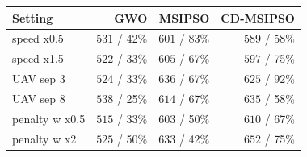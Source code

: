 \begin{tabular}{lrrr}
\hline
Setting & GWO & MSIPSO & CD-MSIPSO \\
\hline
speed x0.5 & $531$ / 42\% & $601$ / 83\% & $589$ / 58\% \\
speed x1.5 & $522$ / 33\% & $605$ / 67\% & $597$ / 75\% \\
UAV sep 3 & $524$ / 33\% & $636$ / 67\% & $625$ / 92\% \\
UAV sep 8 & $538$ / 25\% & $614$ / 67\% & $635$ / 58\% \\
penalty w x0.5 & $515$ / 33\% & $603$ / 50\% & $610$ / 67\% \\
penalty w x2 & $525$ / 50\% & $633$ / 42\% & $652$ / 75\% \\
\hline
\end{tabular}